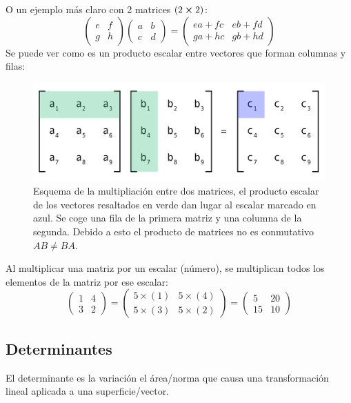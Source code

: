 \documentclass[arial,a4paper,print]{article}
\begin{document}
O un ejemplo más claro con 2 matrices $(2\cross2)$:
\begin{equation*}
	\begin{pmatrix}
		e & f \\
		g & h
	\end{pmatrix}\begin{pmatrix}
		a & b \\
		c & d
	\end{pmatrix}
	=
	\begin{pmatrix}
		ea + fc & eb + fd\\
		ga + hc & gb + hd
	\end{pmatrix}
\end{equation*}
Se puede ver como es un producto escalar entre vectores que forman columnas y filas:
\begin{figure}[h]
	\centering
	\includegraphics[width=0.5\linewidth]{producto_matrices}
	\caption{Esquema de la multipliación entre dos matrices, el producto escalar de los vectores resaltados en verde dan lugar al escalar marcado en azul. Se coge una fila de la primera matriz y una columna de la segunda. Debido a esto el producto de matrices no es conmutativo $AB\neq BA$.}
	\label{fig:productomatrices}
\end{figure}


Al multiplicar una matriz por un escalar (número), se multiplican todos los elementos de la matriz por ese escalar:
\begin{equation*}
	\begin{pmatrix}
		1 & 4  \\
		3 & 2
	\end{pmatrix}
	=
	\begin{pmatrix}
		5 \times (1) & 5\times (4)  \\
		5\times (3) & 5\times (2) 
	\end{pmatrix}
	=
	\begin{pmatrix}
		5 & 20  \\
		15 & 10
	\end{pmatrix}
\end{equation*}

\subsection{Determinantes}
El determinante es la variación el área/norma que causa una transformación lineal aplicada a una superficie/vector.
\end{document}
